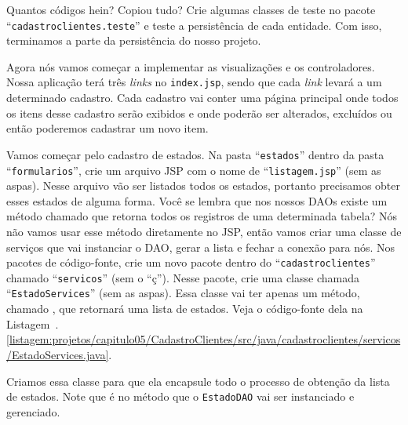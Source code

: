 
Quantos códigos hein? Copiou tudo? Crie algumas classes de teste no pacote\linebreak%
``\texttt{cadastroclientes.teste}'' e teste a persistência de cada entidade. Com isso, terminamos a parte da persistência do nosso projeto.

Agora nós vamos começar a implementar as visualizações e os controladores. Nossa aplicação terá três \textit{links} no \texttt{index.jsp}, sendo que cada \textit{link} levará a um determinado cadastro. Cada cadastro vai conter uma página principal onde todos os itens desse cadastro serão exibidos e onde poderão ser alterados, excluídos ou então poderemos cadastrar um novo item.

Vamos começar pelo cadastro de estados. Na pasta ``\texttt{estados}'' dentro da pasta\linebreak%
``\texttt{formularios}'', crie um arquivo JSP com o nome de ``\texttt{listagem.jsp}'' (sem as aspas). Nesse arquivo vão ser listados todos os estados, portanto precisamos obter esses estados de alguma forma. Você se lembra que nos nossos DAOs existe um método chamado  que retorna todos os registros de uma determinada tabela? Nós não vamos usar esse método diretamente no JSP, então vamos criar uma classe de serviços que vai instanciar o DAO, gerar a lista e fechar a conexão para nós. Nos pacotes de código-fonte, crie um novo pacote dentro do ``\texttt{cadastroclientes}'' chamado ``\texttt{servicos}'' (sem o ``ç''). Nesse pacote, crie uma classe chamada ``\texttt{EstadoServices}'' (sem as aspas). Essa classe vai ter apenas um método, chamado , que retornará uma lista de estados. Veja o código-fonte dela na Listagem~\thechapter.\ref{listagem:projetos/capitulo05/CadastroClientes/src/java/cadastroclientes/servicos/EstadoServices.java}.


Criamos essa classe para que ela encapsule todo o processo de obtenção da lista de estados. Note que é no método  que o \texttt{EstadoDAO} vai ser instanciado e gerenciado.


